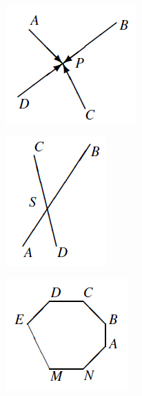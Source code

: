 \documentclass[a4paper]{article}
\renewcommand{\(}{\left(}
\renewcommand{\)}{\right)}
\theoremstyle{plain}
\theoremstyle{plain}
\theoremstyle{definition}
\begin{document}
\begin{figure}[h]
  \centering
\begin{subfigure}{0.45\textwidth}
\centering
\includegraphics[scale = 0.7]{Problem7Fig1}
\caption{}\label{Problem7Fig1}
\end{subfigure}

\begin{subfigure}{0.45\textwidth}
\centering
\includegraphics[scale = 0.7]{Problem7Fig2}
\caption{}\label{Problem7Fig2}
\end{subfigure}
\begin{subfigure}{0.45\textwidth}
\centering
\includegraphics[scale = 0.7]{Problem7Fig3}
\caption{}\label{Problem7Fig3}
\end{subfigure}
\caption{} \label{Problem7 Figures}
\end{figure}
\end{document}
